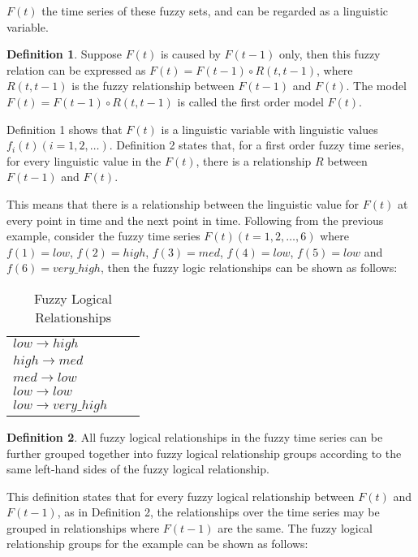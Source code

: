 \documentclass{article}
\theoremstyle{definition}
\newtheorem{ftsdef}{Definition}
\begin{document}
$F(t)$ the time series of these fuzzy sets, and can be regarded as a linguistic variable.

\begin{ftsdef}
Suppose $F(t)$ is caused by $F(t-1)$ only, then this fuzzy relation can be expressed as $F(t)=F(t-1) \circ R(t,t-1)$, where $R(t,t-1)$ is the fuzzy relationship between $F(t-1)$ and $F(t)$. The model $F(t)=F(t-1) \circ R(t,t-1)$ is called the first order model $F(t)$.
\end{ftsdef}

Definition 1 shows that $F(t)$ is a linguistic variable with linguistic values $f_i(t) (i=1,2,\ldots)$. Definition 2 states that, for a first order fuzzy time series, for every linguistic value in the $F(t)$, there is a relationship $R$ between $F(t-1)$ and $F(t)$. 

This means that there is a relationship between the linguistic value for $F(t)$ at every point in time and the next point in time. Following from the previous example, consider the fuzzy time series $F(t)(t=1,2,\ldots,6)$ where $f(1)=low$, $f(2)=high$, $f(3)=med$, $f(4)=low$, $f(5)=low$ and $f(6)=very\_high$, then the fuzzy logic relationships can be shown as follows: 


\begin{table}[h]
	\center
	\begin{tabular}{ l l l }
  	$low \rightarrow high$  \\
  	$high \rightarrow med$ \\
  	$med \rightarrow low$ \\
  	$low \rightarrow low$ \\
  	$low \rightarrow very\_high$ \\
	\end{tabular}
	\caption{Fuzzy Logical Relationships}
\end{table}

\begin{ftsdef}
All fuzzy logical relationships in the fuzzy time series can be further grouped together into fuzzy logical relationship groups according to the same left-hand sides of the fuzzy logical relationship.
\end{ftsdef}

This definition states that for every fuzzy logical relationship between $F(t)$ and $F(t-1)$, as in Definition 2, the relationships over the time series may be grouped in relationships where $F(t-1)$ are the same. The fuzzy logical relationship groups for the example can be shown as follows:
\end{document}
